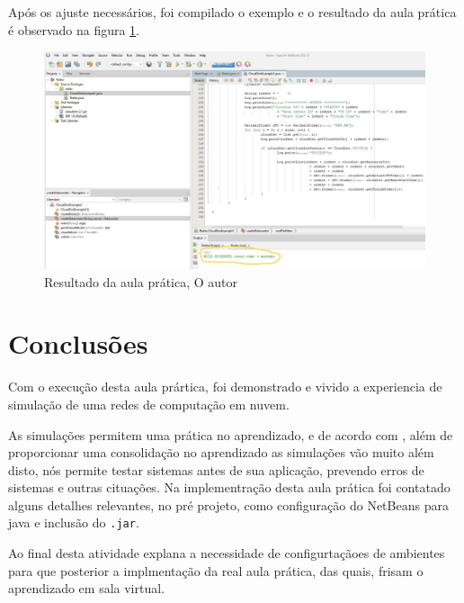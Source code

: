 



\newpage
\par Após os ajuste necessários, foi compilado o exemplo e o resultado da aula prática é observado na figura \ref{fig:result_pratic}.

\begin{figure}[h]
  \center
  \includegraphics[width=\textwidth]{figure/result_pratic.jpg}
  \caption{Resultado da aula prática, O autor}
  \label{fig:result_pratic}
\end{figure}
\section{Conclusões}
\par Com o execução desta aula prártica, foi demonstrado e vivido a experiencia de simulação de uma redes de computação em nuvem.
\par As simulações permitem uma prática no aprendizado, e de acordo com , além de proporcionar uma consolidação no aprendizado as simulações vão muito além disto, nós permite testar sistemas antes de sua aplicação, prevendo erros de sistemas e outras cituações. Na implementração desta aula prática foi contatado alguns detalhes relevantes, no pré projeto, como configuração do NetBeans para java e inclusão do \verb#.jar#.
\par Ao final desta atividade explana a necessidade de configurtaçãoes de ambientes para que posterior a implmentação da real aula prática, das quais, frisam o aprendizado em sala virtual.





